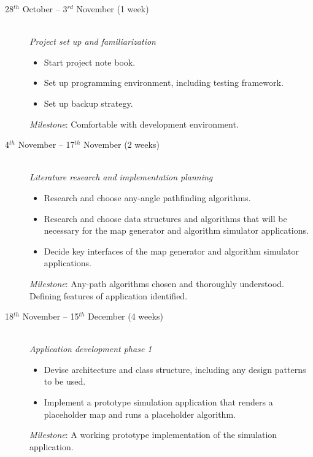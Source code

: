 \begin{description}

\item[28$^{th}$ October -- 3$^{rd}$ November (1 week)] \hfill \\

{\em Project set up and familiarization}
\begin{itemize}
\item Start project note book.
\item Set up programming environment, including testing framework.
\item Set up backup strategy.
\end{itemize}
{\em Milestone}: Comfortable with development environment.\\

\item[4$^{th}$ November -- 17$^{th}$ November (2 weeks)] \hfill \\

{\em Literature research and implementation planning}
\begin{itemize}
\item Research and choose any-angle pathfinding algorithms.
\item Research and choose data structures and algorithms that will be necessary for the map generator and algorithm simulator applications.
\item Decide key interfaces of the map generator and algorithm simulator applications.
\end{itemize}
{\em Milestone}: Any-path algorithms chosen and thoroughly understood. Defining features of application identified.\\

\item[18$^{th}$ November -- 15$^{th}$ December (4 weeks)] \hfill \\

{\em Application development phase 1}
\begin{itemize}
\item Devise architecture and class structure, including any design patterns to be used.
\item Implement a prototype simulation application that renders a \\placeholder map and runs a placeholder algorithm. 
\end{itemize}
{\em Milestone}: A working prototype implementation of the simulation application.\\


\end{description}
